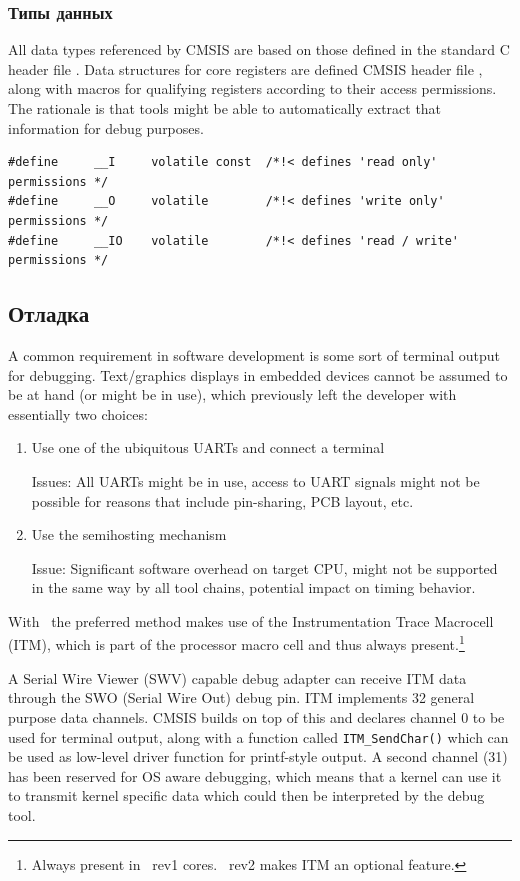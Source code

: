 \subsubsection{Типы данных}

All data types referenced by CMSIS are based on those defined in the standard C
header file . Data structures for core registers are defined
CMSIS header file , along with macros for qualifying registers
according to their access permissions. The rationale is that tools might be able
to automatically extract that information for debug purposes.

\begin{lstlisting}[style=cpp]
#define 	__I 	volatile const	/*!< defines 'read only' permissions */
#define		__O 	volatile 		/*!< defines 'write only' permissions */
#define 	__IO 	volatile 		/*!< defines 'read / write' permissions */
\end{lstlisting}

\subsection{Отладка}

A common requirement in software development is some sort of terminal output for
debugging. Text/graphics displays in embedded devices cannot be assumed to be at
hand (or might be in use), which previously left the developer with essentially 
two choices:

\begin{enumerate}
\item Use one of the ubiquitous UARTs and connect a terminal

Issues: All UARTs might be in use, access to UART signals might not be possible
for reasons that include pin-sharing, PCB layout, etc.

\item Use the semihosting mechanism

Issue: Significant software overhead on target CPU, might not be supported in
the same way by all tool chains, potential impact on timing behavior.
\end{enumerate}

With \ the preferred method makes use of the Instrumentation Trace
Macrocell (ITM), which is part of the processor macro cell and thus always
present.\footnote{Always present in \ rev1 cores. \ rev2 makes
ITM an optional feature.}

A Serial Wire Viewer (SWV) capable debug adapter can receive ITM data through
the SWO (Serial Wire Out) debug pin. ITM implements 32 general purpose data
channels. CMSIS builds on top of this and declares channel 0 to be used for
terminal output, along with a function called \verb|ITM_SendChar()| which can be
used as low-level driver function for printf-style output. A second channel (31) 
has been reserved for OS aware debugging, which means that a kernel can use it
to transmit kernel specific data which could then be interpreted by the debug
tool. 

